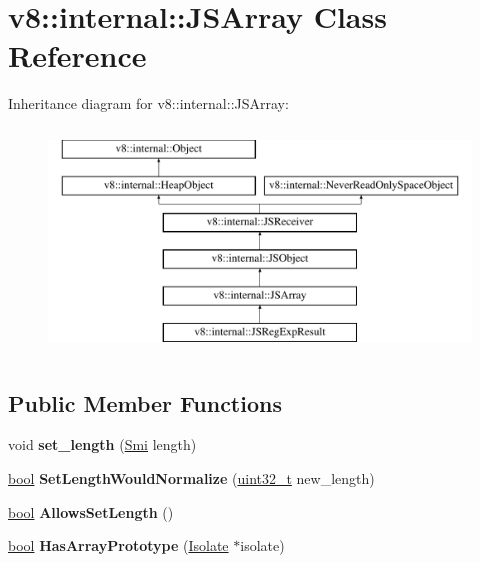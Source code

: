 \hypertarget{classv8_1_1internal_1_1JSArray}{}\section{v8\+:\+:internal\+:\+:J\+S\+Array Class Reference}
\label{classv8_1_1internal_1_1JSArray}
Inheritance diagram for v8\+:\+:internal\+:\+:J\+S\+Array\+:\begin{figure}[H]
\begin{center}
\leavevmode
\includegraphics[height=6.000000cm]{classv8_1_1internal_1_1JSArray}
\end{center}
\end{figure}
\subsection*{Public Member Functions}
\begin{DoxyCompactItemize}
\item 
\mbox{\label{classv8_1_1internal_1_1JSArray_a54ff148702abd700a56f5b79d2d527fc}} 
void {\bfseries set\+\_\+length} (\mbox{\hyperlink{classv8_1_1internal_1_1Smi}{Smi}} length)
\item 
\mbox{\label{classv8_1_1internal_1_1JSArray_a08a73b7a43f807fb88bf9df19855fad3}} 
\mbox{\hyperlink{classbool}{bool}} {\bfseries Set\+Length\+Would\+Normalize} (\mbox{\hyperlink{classuint32__t}{uint32\+\_\+t}} new\+\_\+length)
\item 
\mbox{\label{classv8_1_1internal_1_1JSArray_ae90f5435e217abb3debb5b5e28ec4eb5}} 
\mbox{\hyperlink{classbool}{bool}} {\bfseries Allows\+Set\+Length} ()
\item 
\mbox{\label{classv8_1_1internal_1_1JSArray_a942aa05a4af5d802acf8679cf5c35a82}} 
\mbox{\hyperlink{classbool}{bool}} {\bfseries Has\+Array\+Prototype} (\mbox{\hyperlink{classv8_1_1internal_1_1Isolate}{Isolate}} $\ast$isolate)
\end{DoxyCompactItemize}
